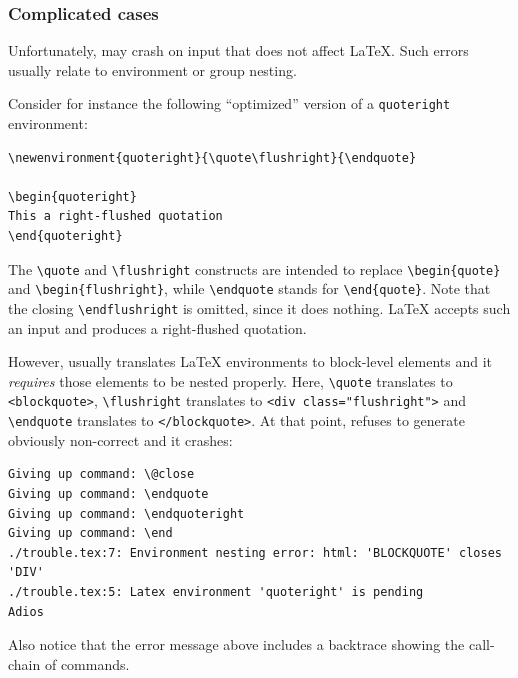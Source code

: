 \subsubsection{Complicated cases}

Unfortunately, \hevea{} may crash on input that does not affect
\LaTeX.
Such errors usually relate to environment or group nesting.

Consider for instance the following ``optimized'' version of a
\verb+quoteright+  environment:
\begin{verbatim}
\newenvironment{quoteright}{\quote\flushright}{\endquote}

\begin{quoteright}
This a right-flushed quotation
\end{quoteright}
\end{verbatim}

The \verb+\quote+ and \verb+\flushright+ constructs
are intended to replace
\verb+\begin{quote}+ and \verb+\begin{flushright}+,
while \verb+\endquote+ stands for \verb+\end{quote}+.
Note that the closing \verb+\endflushright+
is omitted, since it does nothing.
\LaTeX{} accepts such an input and produces a  right-flushed quotation.

However,  \hevea{} usually translates \LaTeX{} environments  to \html{}
block-level elements and it \emph{requires}
those elements to be nested properly.
Here, \verb+\quote+ translates to \verb+<blockquote>+,
\verb+\flushright+ translates to \verb+<div class="flushright">+ and
\verb+\endquote+ translates to \verb+</blockquote>+.
At that point, \hevea{} refuses to generate obviously
non-correct {\html} and it crashes:
\begin{verbatim}
Giving up command: \@close
Giving up command: \endquote
Giving up command: \endquoteright
Giving up command: \end
./trouble.tex:7: Environment nesting error: html: 'BLOCKQUOTE' closes 'DIV'
./trouble.tex:5: Latex environment 'quoteright' is pending
Adios
\end{verbatim}
Also notice that the error message above includes a backtrace showing
the call-chain of commands.


